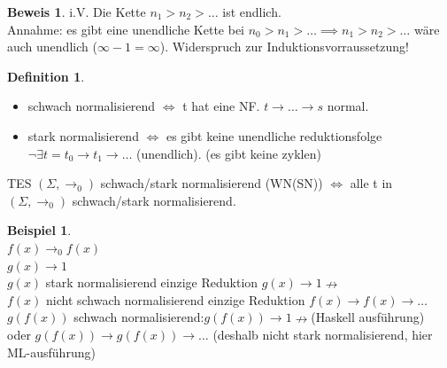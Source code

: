 \documentclass{article}
\newcommand{\nto}{\nrightarrow}
\theoremstyle{definition}
\newtheorem{beweis}{Beweis}[section]
\newtheorem{beispiel}{Beispiel}[section]
\newtheorem{definition}{Definition}[section]
\begin{document}
	\begin{beweis}
	i.V. Die Kette $n_1>n_2>\dots$ ist endlich.\\
	Annahme: es gibt eine unendliche Kette bei $n_0>n_1>\dots\implies n_1>n_2>\dots$ wäre auch unendlich ($\infty-1=\infty$). Widerspruch zur Induktionsvorraussetzung!\\
	\end{beweis}
	\begin{definition}\ \\
	\begin{itemize}
		\item schwach normalisierend $\iff$ t hat eine NF. $t\to\dots\to s$ normal.
		\item stark normalisierend $\iff$ es gibt keine unendliche reduktionsfolge $\lnot\exists t=t_0\to t_1\to\dots$ (unendlich). (es gibt keine zyklen)
	\end{itemize}
	TES $(\Sigma,\to_0)$ schwach/stark normalisierend (WN(SN)) $\iff$ alle t in $(\Sigma,\to_0)$ schwach/stark normalisierend.
	\end{definition}
	\begin{beispiel}\ \\
	$f(x)\to_0 f(x)$\\
	$g(x)\to 1$\\
	$g(x)$ stark normalisierend einzige Reduktion $g(x)\to 1\nto$\\
	$f(x)$ nicht schwach normalisierend einzige Reduktion $f(x)\to f(x)\to\dots$\\
	$g(f(x))$ schwach normalisierend:$g(f(x))\to 1\nto$(Haskell ausführung)\\
	oder $g(f(x))\to g(f(x))\to\dots$ (deshalb nicht stark normalisierend, hier ML-ausführung)
	\end{beispiel}
\end{document}
